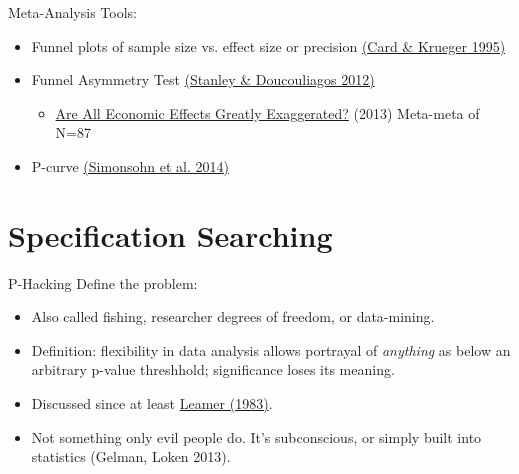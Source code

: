 \documentclass{beamer}
\begin{document}
\begin{frame}{Meta-Analysis}
Tools:
\begin{itemize}[<.->]
\item Funnel plots of sample size vs. effect size or precision \href{http://www.jstor.org/stable/2117925}{(Card \& Krueger 1995)}
\item Funnel Asymmetry Test \href{https://books.google.com/books?id=jSQEdEsL7VoC}{(Stanley \& Doucouliagos 2012)}
\begin{itemize}
\item \href{http://onlinelibrary.wiley.com/doi/10.1111/j.1467-6419.2011.00706.x/full}{Are All Economic Effects Greatly Exaggerated?} (2013) Meta-meta of N=87
\end{itemize}
\item P-curve \href{http://p-curve.com/}{(Simonsohn et al. 2014)} \href{http://p-curve.com/}{}
\end{itemize}
\end{frame}
\section{Specification Searching}
\begin{frame}[<.->]{P-Hacking}
Define the problem:
\begin{itemize}
\item
Also called fishing, researcher degrees of freedom, or data-mining.
\item
Definition: flexibility in data analysis allows portrayal of \textit{anything} as below an arbitrary p-value threshhold; significance loses its meaning.
\item Discussed since at least \href{http://www.jstor.org/stable/1803924}{Leamer (1983)}.
\item
Not something only evil people do. It's subconscious, or simply built into statistics (Gelman, Loken 2013).
\end{itemize}
\end{frame}
\end{document}

